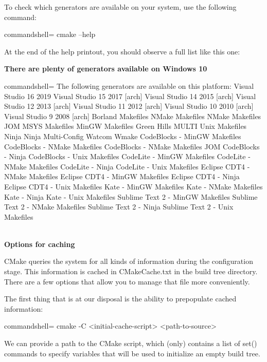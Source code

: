 To check which generators are available on your system, use the following command:

\begin{tcblisting}{commandshell={}}
cmake --help
\end{tcblisting}

At the end of the help printout, you should observe a full list like this one:

\textbf{There are plenty of generators available on Windows 10}

\begin{tcblisting}{commandshell={}}
The following generators are available on this platform:
Visual Studio 16 2019
Visual Studio 15 2017 [arch]
Visual Studio 14 2015 [arch]
Visual Studio 12 2013 [arch]
Visual Studio 11 2012 [arch]
Visual Studio 10 2010 [arch]
Visual Studio 9 2008 [arch]
Borland Makefiles
NMake Makefiles
NMake Makefiles JOM
MSYS Makefiles
MinGW Makefiles
Green Hills MULTI
Unix Makefiles
Ninja
Ninja Multi-Config
Watcom Wmake
CodeBlocks - MinGW Makefiles
CodeBlocks - NMake Makefiles
CodeBlocks - NMake Makefiles JOM
CodeBlocks - Ninja
CodeBlocks - Unix Makefiles
CodeLite - MinGW Makefiles
CodeLite - NMake Makefiles
CodeLite - Ninja
CodeLite - Unix Makefiles
Eclipse CDT4 - NMake Makefiles
Eclipse CDT4 - MinGW Makefiles
Eclipse CDT4 - Ninja
Eclipse CDT4 - Unix Makefiles
Kate - MinGW Makefiles
Kate - NMake Makefiles
Kate - Ninja
Kate - Unix Makefiles
Sublime Text 2 - MinGW Makefiles
Sublime Text 2 - NMake Makefiles
Sublime Text 2 - Ninja
Sublime Text 2 - Unix Makefiles
\end{tcblisting}

\hspace*{\fill} \\ %
\noindent
\textbf{Options for caching}

CMake queries the system for all kinds of information during the configuration stage. This information is cached in CMakeCache.txt in the build tree directory. There are a few options that allow you to manage that file more conveniently.

The first thing that is at our disposal is the ability to prepopulate cached information:

\begin{tcblisting}{commandshell={}}
cmake -C <initial-cache-script> <path-to-source>
\end{tcblisting}

We can provide a path to the CMake script, which (only) contains a list of set() commands to specify variables that will be used to initialize an empty build tree.

